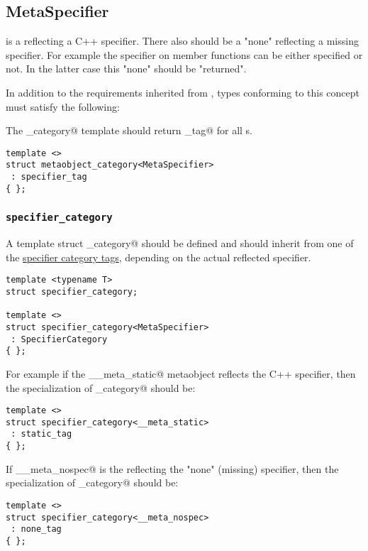 \subsection{MetaSpecifier}
\label{concept-MetaSpecifier}

 is a  reflecting a C++ specifier. There also should be a "none"
 reflecting a missing specifier. For example the \verb@const@ specifier
on member functions can be either specified or not. In the latter case this "none" 
should be "returned".


In addition to the requirements inherited from , types conforming to this concept
must satisfy the following:

The \verb@metaobject_category@ template should return \verb@specifier_tag@ for all s.

\begin{verbatim}
template <>
struct metaobject_category<MetaSpecifier>
 : specifier_tag
{ };
\end{verbatim}

\subsubsection{\texttt{specifier\_category}}

A template struct \verb@specifier_category@ should be defined and should inherit from one of the
\hyperref[specifier-category-tags]{specifier category tags}, depending on
the actual reflected specifier.

\begin{verbatim}
template <typename T>
struct specifier_category;

template <>
struct specifier_category<MetaSpecifier>
 : SpecifierCategory
{ };
\end{verbatim}

For example if the \verb@__meta_static@ metaobject reflects the \verb@static@
C++ specifier, then the specialization of \verb@specifier_category@
should be:

\begin{verbatim}
template <>
struct specifier_category<__meta_static>
 : static_tag
{ };
\end{verbatim}

If \verb@__meta_nospec@ is the  reflecting the "none" (missing) specifier,
then the specialization of \verb@specifier_category@ should be:

\begin{verbatim}
template <>
struct specifier_category<__meta_nospec>
 : none_tag
{ };
\end{verbatim}


